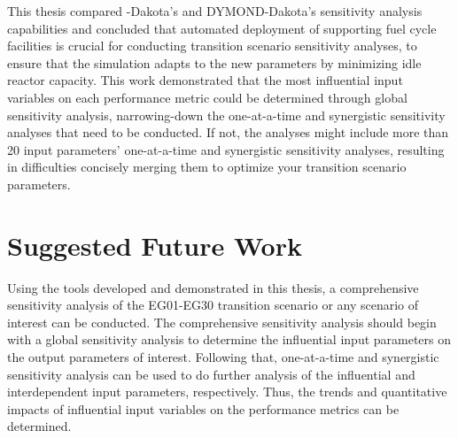 This thesis compared \Cyclus-Dakota's and DYMOND-Dakota's sensitivity analysis 
capabilities 
and concluded that automated deployment of supporting fuel cycle 
facilities is crucial for conducting transition scenario sensitivity analyses, 
to ensure that the simulation 
adapts to the new parameters by minimizing idle reactor capacity.
This work demonstrated that the most influential input variables 
on each performance 
metric could be determined through global sensitivity 
analysis, narrowing-down the one-at-a-time and 
synergistic sensitivity analyses that need to be conducted.  
If not, the analyses might include more than 20 input parameters' 
one-at-a-time and synergistic sensitivity analyses, 
resulting in difficulties concisely merging them to optimize your 
transition scenario parameters.

\section{Suggested Future Work}
Using the tools developed and demonstrated in this thesis, a comprehensive 
sensitivity analysis of the EG01-EG30 transition scenario or any scenario of interest 
can be conducted. 
The comprehensive sensitivity analysis should begin with a global
sensitivity analysis to determine the influential input parameters 
on the output parameters of interest. 
Following that, one-at-a-time and synergistic sensitivity analysis can be used to do 
further analysis of the influential and interdependent input parameters, respectively. 
Thus, the trends and quantitative impacts of influential input variables on the performance 
metrics can be determined.  